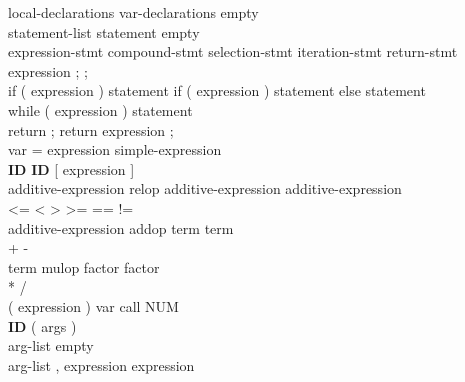 \documentclass[bigger]{beamer}
\begin{document}
\begin{bnf*}
  {local-declarations var-declarations \bnfor empty} \\
  {statement-list statement \bnfor empty} \\
  {expression-stmt \bnfor compound-stmt \bnfor selection-stmt \bnfor iteration-stmt \bnfor return-stmt} \\
  {expression ; \bnfor ;} \\
  {if ( expression ) statement \bnfor if ( expression ) statement else statement} \\
  {while ( expression ) statement} \\
  {return ; \bnfor return expression ;} \\
  {var = expression \bnfor simple-expression} \\
  {\textbf{ID} \bnfor \textbf{ID} [ expression ]} \\
  {additive-expression relop additive-expression \bnfor additive-expression} \\
  {<= \bnfor < \bnfor > \bnfor >= \bnfor == \bnfor !=} \\
  {additive-expression addop term \bnfor term} \\
  {+ \bnfor -} \\
  {term mulop factor \bnfor factor} \\
  {* \bnfor /} \\
  {( expression ) \bnfor var \bnfor call \bnfor NUM} \\
  {\textbf{ID} ( args )} \\
  {arg-list \bnfor empty} \\
  {arg-list , expression \bnfor expression} \\\end{bnf*}
\end{document}
